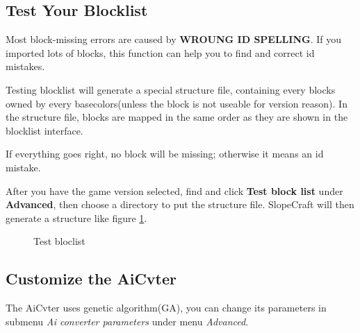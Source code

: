 \documentclass{article}
\begin{document}
\subsection{Test Your Blocklist}
Most block-missing errors are caused by \textbf{WROUNG ID SPELLING}. If you imported lots of blocks, this function can help you to find and correct id mistakes.

Testing blocklist will generate a special structure file, containing every blocks owned by every basecolors(unless the block is not useable for version reason). In the structure file, blocks are mapped in the same order as they are shown in the blocklist interface.

If everything goes right, no block will be missing; otherwise it means an id mistake.

After you have the game version selected, find and click \textbf{Test block list} under \textbf{Advanced}, then choose a directory to put the structure file. SlopeCraft will then generate a structure like figure \ref*{testBlockListNBT}.

\begin{figure}[htbp]
    \centering
    \caption{Test bloclist}
    \label{testBlockListNBT}
\end{figure}

\subsection{Customize the AiCvter}
\label{CustomizeAiCvter}
The AiCvter uses genetic algorithm(GA), you can change its parameters in submenu \textit{Ai converter parameters} under menu \textit{Advanced}.
\end{document}
